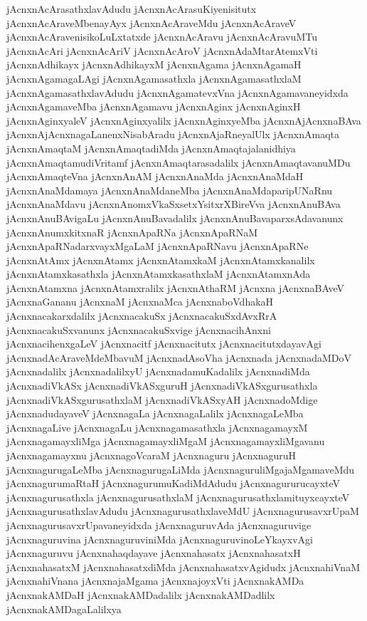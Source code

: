 {jAcnxnAcArasathxlavAdudu
jAcnxnAcArasuKiyenisitutx
jAcnxnAcAraveMbenayAyx
jAcnxnAcAraveMdu
jAcnxnAcAraveV
jAcnxnAcAravenisikoLuLxtatxde
jAcnxnAcAravu
jAcnxnAcAravuMTu
jAcnxnAcAri
jAcnxnAcAriV
jAcnxnAcAroV
jAcnxnAdaMtarAtemxVti
jAcnxnAdhikayx
jAcnxnAdhikayxM
jAcnxnAgama
jAcnxnAgamaH
jAcnxnAgamagaLAgi
jAcnxnAgamasathxla
jAcnxnAgamasathxlaM
jAcnxnAgamasathxlavAdudu
jAcnxnAgamatevxVna
jAcnxnAgamavaneyidxda
jAcnxnAgamaveMba
jAcnxnAgamavu
jAcnxnAginx
jAcnxnAginxH
jAcnxnAginxyaleV
jAcnxnAginxyalilx
jAcnxnAginxyeMba
jAcnxnAjAcnxnaBAva
jAcnxnAjAcnxnagaLanenxNisabAradu
jAcnxnAjaRneyalUlx
jAcnxnAmaqta
jAcnxnAmaqtaM
jAcnxnAmaqtadiMda
jAcnxnAmaqtajalanidhiya
jAcnxnAmaqtamudiVritamf
jAcnxnAmaqtarasadalilx
jAcnxnAmaqtavanuMDu
jAcnxnAmaqteVna
jAcnxnAnAM
jAcnxnAnaMda
jAcnxnAnaMdaH
jAcnxnAnaMdamaya
jAcnxnAnaMdaneMba
jAcnxnAnaMdaparipUNaRnu
jAcnxnAnaMdavu
jAcnxnAnomxVkaSxsetxYsitxrXBireVva
jAcnxnAnuBAva
jAcnxnAnuBAvigaLu
jAcnxnAnuBavadalilx
jAcnxnAnuBavaparxsAdavanunx
jAcnxnAnumxkitxnaR
jAcnxnApaRNa
jAcnxnApaRNaM
jAcnxnApaRNadarxvayxMgaLaM
jAcnxnApaRNavu
jAcnxnApaRNe
jAcnxnAtAmx
jAcnxnAtamx
jAcnxnAtamxkaM
jAcnxnAtamxkanalilx
jAcnxnAtamxkasathxla
jAcnxnAtamxkasathxlaM
jAcnxnAtamxnAda
jAcnxnAtamxna
jAcnxnAtamxralilx
jAcnxnAthaRM
jAcnxna
jAcnxnaBAveV
jAcnxnaGananu
jAcnxnaM
jAcnxnaMca
jAcnxnaboVdhakaH
jAcnxnacakarxdalilx
jAcnxnacakuSx
jAcnxnacakuSxdAvxRrA
jAcnxnacakuSxvanunx
jAcnxnacakuSxvige
jAcnxnacihAnxni
jAcnxnacihenxgaLeV
jAcnxnacitf
jAcnxnacitutx
jAcnxnacitutxdayavAgi
jAcnxnadAcAraveMdeMbavuM
jAcnxnadAsoVha
jAcnxnada
jAcnxnadaMDoV
jAcnxnadalilx
jAcnxnadalilxyU
jAcnxnadamuKadalilx
jAcnxnadiMda
jAcnxnadiVkASx
jAcnxnadiVkASxguruH
jAcnxnadiVkASxgurusathxla
jAcnxnadiVkASxgurusathxlaM
jAcnxnadiVkASxyAH
jAcnxnadoMdige
jAcnxnadudayaveV
jAcnxnagaLa
jAcnxnagaLalilx
jAcnxnagaLeMba
jAcnxnagaLive
jAcnxnagaLu
jAcnxnagamasathxla
jAcnxnagamayxM
jAcnxnagamayxliMga
jAcnxnagamayxliMgaM
jAcnxnagamayxliMgavanu
jAcnxnagamayxnu
jAcnxnagoVcaraM
jAcnxnaguru
jAcnxnaguruH
jAcnxnagurugaLeMba
jAcnxnagurugaLiMda
jAcnxnaguruliMgajaMgamaveMdu
jAcnxnagurumaRtaH
jAcnxnagurumuKadiMdAdudu
jAcnxnagururucayxteV
jAcnxnagurusathxla
jAcnxnagurusathxlaM
jAcnxnagurusathxlamituyxcayxteV
jAcnxnagurusathxlavAdudu
jAcnxnagurusathxlaveMdU
jAcnxnagurusavxrUpaM
jAcnxnagurusavxrUpavaneyidxda
jAcnxnaguruvAda
jAcnxnaguruvige
jAcnxnaguruvina
jAcnxnaguruviniMda
jAcnxnaguruvinoLeYkayxvAgi
jAcnxnaguruvu
jAcnxnahaqdayave
jAcnxnahasatx
jAcnxnahasatxH
jAcnxnahasatxM
jAcnxnahasatxdiMda
jAcnxnahasatxvAgidudx
jAcnxnahiVnaM
jAcnxnahiVnana
jAcnxnajaMgama
jAcnxnajoyxVti
jAcnxnakAMDa
jAcnxnakAMDaH
jAcnxnakAMDadalilx
jAcnxnakAMDadlilx
jAcnxnakAMDagaLalilxya
}
